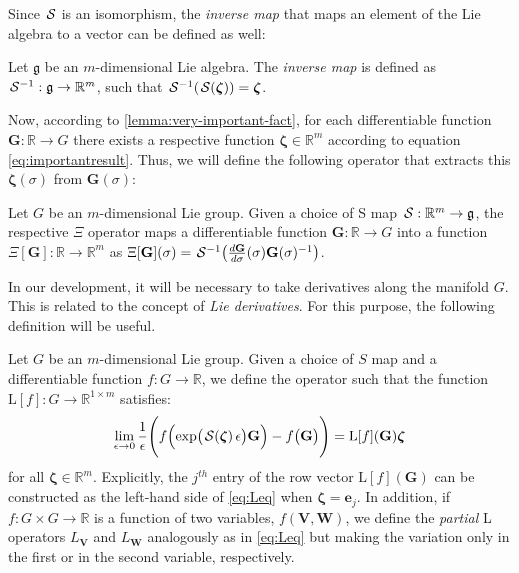Since $\SL$ is an isomorphism, the \emph{inverse map} that maps an element of the Lie algebra to a vector can be defined as well:
\begin{definition}\label{def:inverse-isomorphism-SLinv}
    Let $\mathfrak{g}$ be an $m$-dimensional Lie algebra. The \emph{inverse map} is defined as $\invSL:\mathfrak{g}\to\mathbb{R}^m$, such that $\invSL[\SL[\boldsymbol{\zeta}]] = \boldsymbol{\zeta}$. 
\end{definition}

Now, according to \cref{lemma:very-important-fact}, for each differentiable function $\mathbf{G}: \mathbb{R} \to G$ there exists a respective function $\boldsymbol{\zeta} \in \mathbb{R}^m$ according to equation \eqref{eq:importantresult}. Thus, we will define the following operator that extracts this $\boldsymbol{\zeta}(\sigma)$ from $\mathbf{G}(\sigma)$:
\begin{definition} [$\Xi$ operator] \label{def:Xioperator} Let $G$ be an $m$-dimensional Lie group. Given a choice of S map $\SL: \mathbb{R}^m \to \mathfrak{g}$, the respective $\Xi$ operator maps a differentiable function $\mathbf{G}: \mathbb{R} \to G$ into a function $\Xi[\mathbf{G}]: \mathbb{R} \to \mathbb{R}^m$ as $\Xi[\mathbf{G}](\sigma) = \SL^{-1}\bigl(\frac{d\mathbf{G}}{d\sigma}(\sigma)\mathbf{G}(\sigma)^{-1}\bigr)$. 
\end{definition}

In our development, it will be necessary to take derivatives along the manifold $G$. This is related to the concept of \emph{Lie derivatives}. For this purpose, the following definition will be useful.
\begin{definition}  \label{def:Loperator} Let $G$ be an $m$-dimensional Lie group. Given a choice of $S$ map and a differentiable function $f: G \to \mathbb{R}$, we define the  operator such that the function $\text{L}[f] : G \to \mathbb{R}^{1 \times m}$ satisfies:
\begin{equation}
\label{eq:Leq}
    \lim_{\epsilon \rightarrow 0} \frac{1}{\epsilon} \Biggl( f\Bigl(\exp\bigl(\SL[\boldsymbol{\zeta}]\epsilon\bigr)\mathbf{G}\Bigr) - f\bigl(\mathbf{G}\bigr) \Biggr) = \text{L}[f](\mathbf{G}) \boldsymbol{\zeta}
\end{equation}
for all $\boldsymbol{\zeta} \in \mathbb{R}^m$. Explicitly, the $j^{th}$ entry of the row vector $\text{L}[f](\mathbf{G})$ can be constructed as the left-hand side of \eqref{eq:Leq} when $\boldsymbol{\zeta} = \mathbf{e}_j$. In addition, if $f: G \times G \to \mathbb{R}$ is a function of two variables, $f(\mathbf{V},\mathbf{W})$, we define the \emph{partial} L operators $L_{\mathbf{V}}$ and $L_{\mathbf{W}}$ analogously as in \eqref{eq:Leq} but making the variation only in the first or in the second variable, respectively. 
\end{definition}

